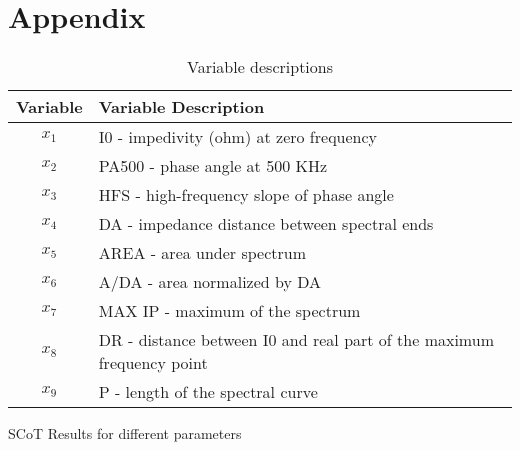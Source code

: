 \documentclass[11pt,letterpaper]{report}
\begin{document}
\section*{Appendix}
\begin{table}[htpb!]
\caption{Variable descriptions}
\label{tab1:dta_vars}
\begin{center}
 \begin{tabular}{||c l||}
 \hline
Variable & Variable Description \\ [0.5ex] 
 \hline\hline
 $x_{1}$ & I0 - impedivity (ohm) at zero frequency \\ 
 \hline
 $x_{2}$ & 	PA500 - phase angle at 500 KHz \\
 \hline
 $x_{3}$ & HFS - high-frequency slope of phase angle \\
 \hline
 $x_{4}$ & DA - impedance distance between spectral ends \\
 \hline
 $x_{5}$ & AREA - area under spectrum \\
 \hline
 $x_{6}$ & 	A/DA - area normalized by DA \\
 \hline
 $x_{7}$ & MAX IP - maximum of the spectrum \\
 \hline
 $x_{8}$ & 	DR - distance between I0 and real part of the maximum frequency point \\
 \hline
 $x_{9}$ & P - length of the spectral curve \\ [1ex] 
 \hline
\end{tabular}
\end{center}
\end{table}

\begin{table}[htpb!]
    \centering
    \caption{SCoT Results for different parameters}
    \label{rstl:scot}
    
\end{table}
\end{document}
